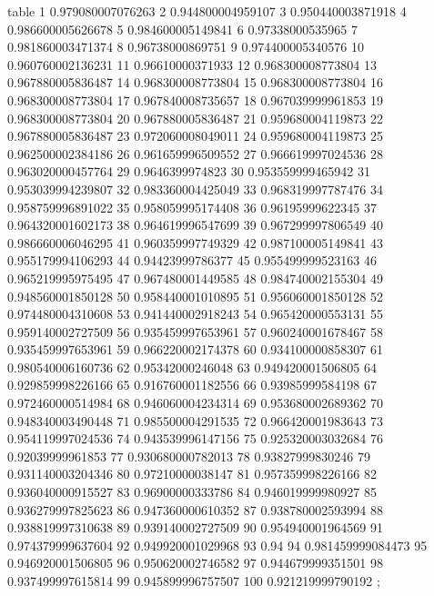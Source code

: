 table {%
	1 0.979080007076263
	2 0.944800004959107
	3 0.950440003871918
	4 0.986600005626678
	5 0.984600005149841
	6 0.97338000535965
	7 0.981860003471374
	8 0.96738000869751
	9 0.974400005340576
	10 0.960760002136231
	11 0.96610000371933
	12 0.968300008773804
	13 0.967880005836487
	14 0.968300008773804
	15 0.968300008773804
	16 0.968300008773804
	17 0.967840008735657
	18 0.967039999961853
	19 0.968300008773804
	20 0.967880005836487
	21 0.959680004119873
	22 0.967880005836487
	23 0.972060008049011
	24 0.959680004119873
	25 0.962500002384186
	26 0.961659996509552
	27 0.966619997024536
	28 0.963020000457764
	29 0.9646399974823
	30 0.953559999465942
	31 0.953039994239807
	32 0.983360004425049
	33 0.968319997787476
	34 0.958759996891022
	35 0.958059995174408
	36 0.96195999622345
	37 0.964320001602173
	38 0.964619996547699
	39 0.967299997806549
	40 0.986660006046295
	41 0.960359997749329
	42 0.987100005149841
	43 0.955179994106293
	44 0.94423999786377
	45 0.955499999523163
	46 0.965219995975495
	47 0.967480001449585
	48 0.984740002155304
	49 0.948560001850128
	50 0.958440001010895
	51 0.956060001850128
	52 0.974480004310608
	53 0.941440002918243
	54 0.965420000553131
	55 0.959140002727509
	56 0.935459997653961
	57 0.960240001678467
	58 0.935459997653961
	59 0.966220002174378
	60 0.934100000858307
	61 0.980540006160736
	62 0.95342000246048
	63 0.949420001506805
	64 0.929859998226166
	65 0.916760001182556
	66 0.93985999584198
	67 0.972460000514984
	68 0.946060004234314
	69 0.953680002689362
	70 0.948340003490448
	71 0.985500004291535
	72 0.966420001983643
	73 0.954119997024536
	74 0.943539996147156
	75 0.925320003032684
	76 0.92039999961853
	77 0.930680000782013
	78 0.93827999830246
	79 0.931140003204346
	80 0.97210000038147
	81 0.957359998226166
	82 0.936040000915527
	83 0.96900000333786
	84 0.946019999980927
	85 0.936279997825623
	86 0.947360000610352
	87 0.938780002593994
	88 0.938819997310638
	89 0.939140002727509
	90 0.954940001964569
	91 0.974379999637604
	92 0.949920001029968
	93 0.94
	94 0.981459999084473
	95 0.946920001506805
	96 0.950620002746582
	97 0.944679999351501
	98 0.937499997615814
	99 0.945899996757507
	100 0.921219999790192
};
